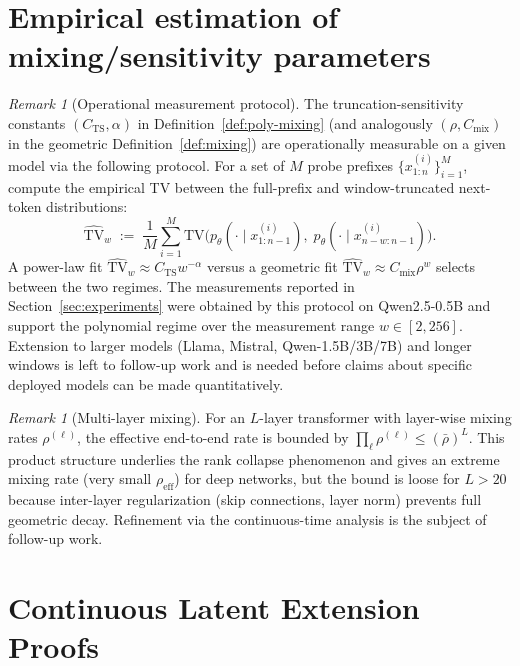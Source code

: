 \documentclass[11pt]{article}
\newcommand{\TV}{\mathrm{TV}}
\theoremstyle{plain}
\theoremstyle{definition}
\theoremstyle{remark}
\newtheorem{remark}[theorem]{Remark}
\begin{document}
\section{Empirical estimation of mixing/sensitivity parameters}\label{app:rho-estimation}

\begin{remark}[Operational measurement protocol]
\label{rmk:rho-estimation-app}
The truncation-sensitivity constants $(C_{\mathrm{TS}}, \alpha)$ in
Definition~\ref{def:poly-mixing} (and analogously $(\rho,
C_{\mathrm{mix}})$ in the geometric Definition~\ref{def:mixing})
are operationally measurable on a given model via the following
protocol. For a set of $M$ probe prefixes
$\{x^{(i)}_{1:n}\}_{i=1}^M$, compute the empirical TV between the
full-prefix and window-truncated next-token distributions:
\[
\widehat{\TV}_w
\;:=\; \frac{1}{M}\sum_{i=1}^M
\TV\!\bigl(p_\theta(\cdot \mid x^{(i)}_{1:n-1}),\;
           p_\theta(\cdot \mid x^{(i)}_{n-w:n-1})\bigr).
\]
A power-law fit
$\widehat{\TV}_w \approx C_{\mathrm{TS}} w^{-\alpha}$ versus a
geometric fit $\widehat{\TV}_w \approx C_{\mathrm{mix}} \rho^w$
selects between the two regimes. The measurements reported in
Section~\ref{sec:experiments} were obtained by this protocol on
Qwen2.5-0.5B and support the polynomial regime over the
measurement range $w \in [2, 256]$. Extension to larger models
(Llama, Mistral, Qwen-1.5B/3B/7B) and longer windows is left to
follow-up work and is needed before claims about specific
deployed models can be made quantitatively.
\end{remark}

\begin{remark}[Multi-layer mixing]
For an $L$-layer transformer with layer-wise mixing rates
$\rho^{(\ell)}$, the effective end-to-end rate is bounded by
$\prod_\ell \rho^{(\ell)} \leq (\bar\rho)^L$. This product structure
underlies the rank collapse phenomenon \citep{dong2021attention} and
gives an extreme mixing rate (very small $\rho_{\mathrm{eff}}$) for
deep networks, but the bound is loose for $L > 20$ because
inter-layer regularization (skip connections, layer norm) prevents
full geometric decay. Refinement via the continuous-time analysis
\citep{geshkovski2023mathematical} is the subject of follow-up work.
\end{remark}

\section{Continuous Latent Extension Proofs}
\label{app:cont-extension}
\end{document}

